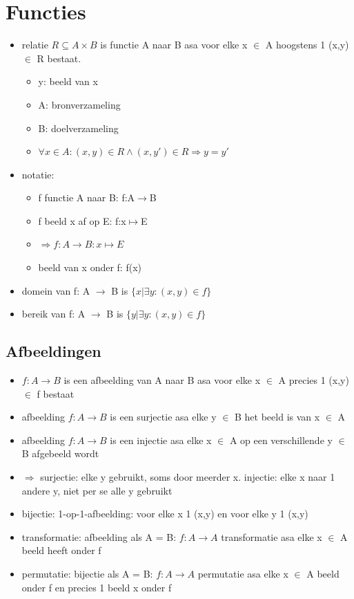 \documentclass{article}
\begin{document}
\section{Functies}
\begin{itemize}
    \item relatie $R \subseteq A \times B$ is functie A naar B asa voor elke x $\in$ A hoogstens 1 (x,y) $\in$ R bestaat.
    \begin{itemize}
        \item y: beeld van x
        \item A: bronverzameling
        \item B: doelverzameling
        \item $\forall x \in A: (x,y) \in R \land (x,y') \in R \Rightarrow y = y'$
    \end{itemize}
    \item notatie:
    \begin{itemize}
        \item f functie A naar B: f:A$\rightarrow$B
        \item f beeld x af op E: f:x$\mapsto$E
        \item $\Rightarrow f:A \rightarrow B: x \mapsto E$
        \item beeld van x onder f: f(x)
    \end{itemize}
    \item domein van f: A $\rightarrow$ B is $\{x| \exists y: (x,y) \in f\}$
    \item bereik van f: A $\rightarrow$ B is $\{y| \exists y: (x,y) \in f\}$
\end{itemize}

\subsection{Afbeeldingen}
\begin{itemize}
    \item $f: A \rightarrow B$ is een afbeelding van A naar B asa voor elke x $\in$ A precies 1 (x,y) $\in$ f bestaat
    \item afbeelding $f: A \rightarrow B$ is een surjectie asa elke y $\in$ B het beeld is van x $\in$ A
    \item afbeelding $f: A \rightarrow B$ is een injectie asa elke x $\in$ A op een verschillende y $\in$ B afgebeeld wordt
    \item \quad $\Rightarrow$ surjectie: elke y gebruikt, soms door meerder x. injectie: elke x naar 1 andere y, niet per se alle y gebruikt
    \item bijectie: 1-op-1-afbeelding: voor elke x 1 (x,y) en voor elke y 1 (x,y)
    \item transformatie: afbeelding als A = B: $f: A \rightarrow A$ transformatie asa elke x $\in$ A beeld  heeft onder f
    \item permutatie: bijectie als A = B: $f: A \rightarrow A$ permutatie asa elke x $\in$ A beeld onder f en precies 1 beeld x onder f
\end{itemize}
\end{document}
